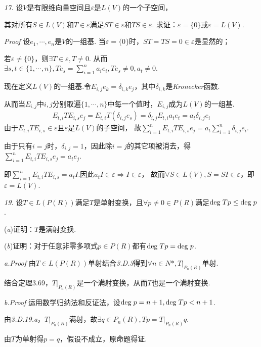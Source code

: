 \newpage

\textit{17.}
设\(V\)是有限维向量空间且\(\varepsilon\)是\(L(V)\)的一个子空间，

其对所有\(S \in L(V)\)和\(T \in \varepsilon\)满足\(ST \in \varepsilon\)和\(TS \in \varepsilon\).
求证：\(\varepsilon=\{0\}\)或\(\varepsilon=L(V)\).

\textit{Proof}
设\(e_1,\cdots,e_n\)是\(V\)的一组基.
当\(\varepsilon =\{0\}\)时，\(ST=TS=0 \in \varepsilon\)是显然的；

若\(\varepsilon \ne \{0\}\)，则\(\exists T \in \varepsilon, T \ne 0\).
从而\(\exists s,t \in \{1,\cdots,n\},Te_s=\sum_{i=1}^n a_ie_i ,Te_s \ne 0, a_t \ne 0\).

现在定义\(L(V)\)的一组基.令\(E_{i,j}e_k=\delta_{i,k}e_j\)，其中\(\delta_{i,k}\)是\textit{Kronecker}函数.

从而当\(E_{i,j}\)中\(i,j\)分别取遍\(\{1,\cdots,n\}\)中每一个值时，\(E_{i,j}\)成为\(L(V)\)的一组基.
    \begin{align*}
        E_{t,i}TE_{i,s}e_j=E_{t,i}T(\delta_{i,j} e_s)=\delta_{i,j}E_{t,i}a_te_t=a_t\delta_{i,j}e_i
    \end{align*}
由于\(E_{t,i}TE_{i,s} \in \varepsilon\)且\(\varepsilon\)是\(L(V)\)的子空间，
故\(\sum_{i=1}^n E_{t,i}TE_{i,s}e_j=a_t \sum_{i=1}^n \delta_{i,j}e_i\).

由于只有\(i=j\)时，\(\delta_{i,j}=1\)，因此除\(i=j\)的其它项被消去，得\(\sum_{i=1}^n E_{t,i}TE_{i,s} e_j=a_te_j\).

即\(\sum_{i=1}^n E_{t,i} T E_{i,s} =a_t I\).因此\(a_t I \in \varepsilon \Rightarrow I \in \varepsilon\)，
故而\(\forall S \in L(V),S=SI \in \varepsilon\)，即\(\varepsilon=L(V)\).

\hspace*{\fill}

\textit{19.}
设\(T \in L(P(R))\)满足\(T\)是单射变换，且\(\forall p \ne 0 \in P(R)\)满足\(\mathrm{deg \;} Tp \leq \mathrm{deg \;} p\).

(\textit{a})证明：\(T\)是满射变换.

(\textit{b})证明：对于任意非零多项式\(p \in P(R)\)都有\(\mathrm{deg \;} Tp=\mathrm{deg \;} p\).

\textit{a.Proof}
由\(T \in L(P(R))\)单射结合\textit{3.D.3}得到\(\forall n \in N*,T|_{P_n(R)}\)单射.

结合定理3.69，\(T|_{P_n(R)}\)是一个满射变换，从而\(T\)也是一个满射变换.

\textit{b.Proof}
运用数学归纳法和反证法，设\(\mathrm{deg \;} p=n+1,\mathrm{deg \;} Tp<n+1\).

由\textit{3.D.19.a}，\(T|_{P_n(R)}\)满射，故\(\exists q \in P_n(R),Tp=T|_{P_n(R)}q\).

由\(T\)为单射得\(p=q\)，假设不成立，原命题得证.

